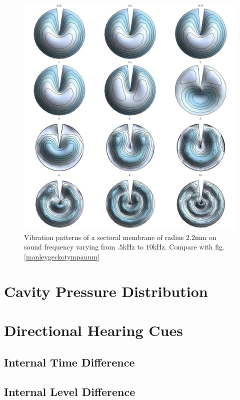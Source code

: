\begin{figure}[ht!]
 \centering
 \includegraphics[width=.75\linewidth]{Diagrams/SectorMembraneModes/sector_membrane_all.png}
 \caption[Sectoral membrane vibration profiles.]{Vibration patterns of a sectoral membrane
 of radius $2.2$mm on sound frequency varying from $.5$kHz to $10$kHz. Compare with fig. \ref{manleygeckotympanum}}
  \label{sectormembraneprofile}
\end{figure}

\section{Cavity Pressure Distribution}

\section{Directional Hearing Cues}

\subsection{Internal Time Difference}

\subsection{Internal Level Difference}